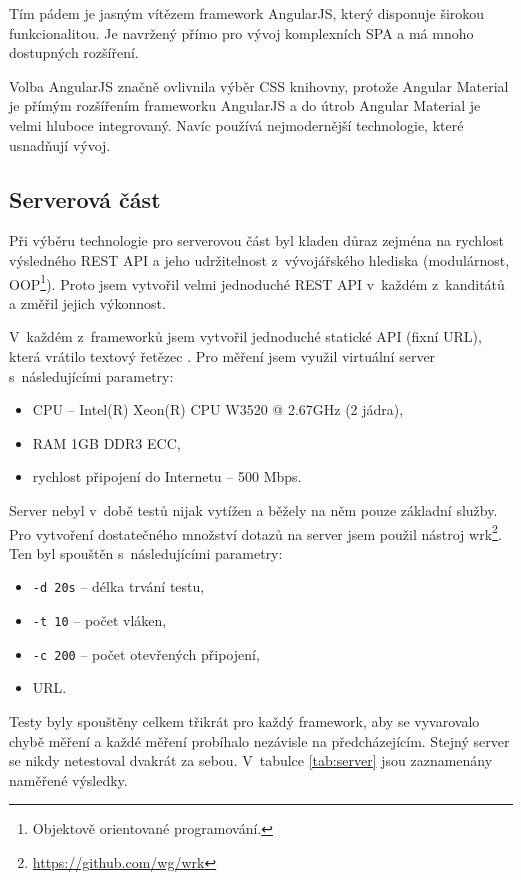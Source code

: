 Tím pádem je jasným vítězem framework AngularJS, který disponuje širokou funkcionalitou. Je navržený přímo pro vývoj komplexních SPA a má mnoho dostupných rozšíření.

Volba AngularJS značně ovlivnila výběr CSS knihovny, protože Angular Material je přímým rozšířením frameworku AngularJS a do útrob Angular Material je velmi hluboce integrovaný. Navíc používá nejmodernější technologie, které usnadňují vývoj.

\subsection{Serverová část}
\label{serv:fin}

Při výběru technologie pro serverovou část byl kladen důraz zejména na rychlost výsledného REST API a jeho udržitelnost z~vývojářského hlediska (modulárnost, OOP\footnote{Objektově orientované programování.}). Proto jsem vytvořil velmi jednoduché REST API v~každém z~kanditátů a změřil jejich výkonnost.

V~každém z~frameworků jsem vytvořil jednoduché statické API (fixní URL), která vrátilo textový řetězec . Pro měření jsem využil virtuální server s~následujícími parametry:

\begin{itemize}
    \item CPU -- Intel(R) Xeon(R) CPU W3520  @ 2.67GHz (2 jádra),
    \item RAM 1GB DDR3 ECC,
    \item rychlost připojení do Internetu -- 500 Mbps.
\end{itemize}

Server nebyl v~době testů nijak vytížen a běžely na něm pouze základní služby. Pro vytvoření dostatečného množství dotazů na server jsem použil nástroj wrk\footnote{\url{https://github.com/wg/wrk}}. Ten byl spouštěn s~následujícími parametry:

\begin{itemize}
    \item \texttt{-d 20s} -- délka trvání testu,
    \item \texttt{-t 10} -- počet vláken,
    \item \texttt{-c 200} -- počet otevřených připojení,
    \item URL.
\end{itemize}

Testy byly spouštěny celkem třikrát pro každý framework, aby se vyvarovalo chybě měření a každé měření probíhalo nezávisle na předcházejícím. Stejný server se nikdy netestoval dvakrát za sebou. V~tabulce \ref{tab:server} jsou zaznamenány naměřené výsledky.

